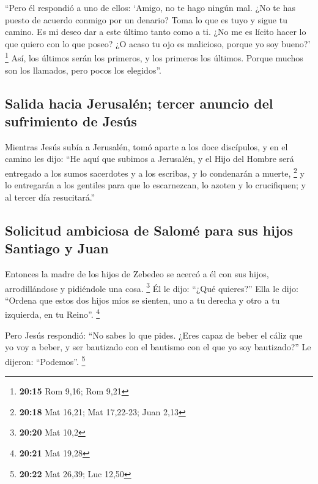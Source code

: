 \begin{paracol}{2}
 ``Pero él respondió a uno de ellos: `Amigo, no te hago
ningún mal. ¿No te has puesto de acuerdo conmigo por un denario?
 Toma lo que es tuyo y sigue tu camino. Es mi deseo dar a
este último tanto como a ti.  ¿No me es lícito hacer lo
que quiero con lo que poseo? ¿O acaso tu ojo es malicioso, porque yo soy
bueno?' \footnote{\textbf{20:15} Rom 9,16; Rom 9,21} 
Así, los últimos serán los primeros, y los primeros los últimos. Porque
muchos son los llamados, pero pocos los elegidos''.

\hypertarget{salida-hacia-jerusaluxe9n-tercer-anuncio-del-sufrimiento-de-jesuxfas}{%
\subsection{Salida hacia Jerusalén; tercer anuncio del sufrimiento de
Jesús}\label{salida-hacia-jerusaluxe9n-tercer-anuncio-del-sufrimiento-de-jesuxfas}}

 Mientras Jesús subía a Jerusalén, tomó aparte a los doce
discípulos, y en el camino les dijo:  ``He aquí que
subimos a Jerusalén, y el Hijo del Hombre será entregado a los sumos
sacerdotes y a los escribas, y lo condenarán a muerte, \footnote{\textbf{20:18}
  Mat 16,21; Mat 17,22-23; Juan 2,13}  y lo entregarán a
los gentiles para que lo escarnezcan, lo azoten y lo crucifiquen; y al
tercer día resucitará.''

\hypertarget{solicitud-ambiciosa-de-salomuxe9-para-sus-hijos-santiago-y-juan}{%
\subsection{Solicitud ambiciosa de Salomé para sus hijos Santiago y
Juan}\label{solicitud-ambiciosa-de-salomuxe9-para-sus-hijos-santiago-y-juan}}

 Entonces la madre de los hijos de Zebedeo se acercó a él
con sus hijos, arrodillándose y pidiéndole una cosa. \footnote{\textbf{20:20}
  Mat 10,2}  Él le dijo: ``¿Qué quieres?'' Ella le dijo:
``Ordena que estos dos hijos míos se sienten, uno a tu derecha y otro a
tu izquierda, en tu Reino''. \footnote{\textbf{20:21} Mat 19,28}

 Pero Jesús respondió: ``No sabes lo que pides. ¿Eres
capaz de beber el cáliz que yo voy a beber, y ser bautizado con el
bautismo con el que yo soy bautizado?'' Le dijeron: ``Podemos''.
\footnote{\textbf{20:22} Mat 26,39; Luc 12,50}


\end{paracol}
